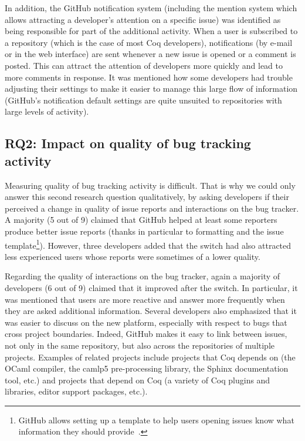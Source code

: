 \documentclass[conference]{IEEEtran}
\begin{document}
In addition, the GitHub notification system (including the mention system which allows attracting a developer's attention on a specific issue) was identified as being responsible for part of the additional activity. When a user is subscribed to a repository (which is the case of most Coq developers), notifications (by e-mail or in the web interface) are sent whenever a new issue is opened or a comment is posted. This can attract the attention of developers more quickly and lead to more comments in response. It was mentioned how some developers had trouble adjusting their settings to make it easier to manage this large flow of information (GitHub's notification default settings are quite unsuited to repositories with large levels of activity).

\subsection{RQ2: Impact on quality of bug tracking activity}

Measuring quality of bug tracking activity is difficult. That is why we could only answer this second research question qualitatively, by asking developers if their perceived a change in quality of issue reports and interactions on the bug tracker. A majority (5 out of 9) claimed that GitHub helped at least some reporters produce better issue reports (thanks in particular to formatting and the issue template\footnote{GitHub allows setting up a template to help users opening issues know what information they should provide~\cite{github_issue_template}.}). However, three developers added that the switch had also attracted less experienced users whose reports were sometimes of a lower quality.

Regarding the quality of interactions on the bug tracker, again a majority of developers (6 out of 9) claimed that it improved after the switch. In particular, it was mentioned that users are more reactive and answer more frequently when they are asked additional information.
Several developers also emphasized that it was easier to discuss on the new platform, especially with respect to bugs that cross project boundaries. Indeed, GitHub makes it easy to link between issues, not only in the same repository, but also across the repositories of multiple projects. Examples of related projects include projects that Coq depends on (the OCaml compiler, the camlp5 pre-processing library, the Sphinx documentation tool, etc.) and projects that depend on Coq (a variety of Coq plugins and libraries, editor support packages, etc.).
\end{document}
